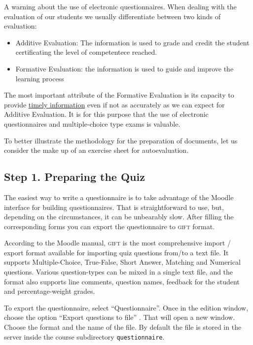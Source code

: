 \documentclass{pracjourn}[2006/02/20]
\begin{document}
A warning about the use of electronic questionnaires.
Wh\-e\-n dealing with the evaluation of our students 
we usually differentiate between two kinds of evaluation:
\begin{itemize}
\item Additive Evaluation: The information is used to grade and credit the
student certificating the level of competentece reached.
\item Formative Evaluation: the information is used to guide and improve the
learning process
\end{itemize}
The most important attribute of the Formative Evaluation
is its capacity to provide \underline{timely information} even if not as accurately
as we can expect for Additive Evaluation.
It is for this purpose that the use of electronic questionnaires
and multiple-choice type exams is valuable. 

To better illustrate the methodology for the preparation of documents,
let us consider the make up of an exercise sheet for 
autoevaluation. 

\subsection*{Step 1. Preparing the Quiz}

The easiest way to write a questionnaire is 
to take advantage of the 
Moodle interface for building questionnaires. 
That is straightforward to use, but,
depending on the circumstances, it can be unbearably 
slow. After filling the corresponding forms
you can export the questionnaire to \textsc{gift} format.

According to the Moodle manual, \textsc{gift} is the most comprehensive import / export
format available for importing quiz questions from/to a text file. 
It supports Multiple-Choice, True-False, Short Answer, Matching
and Numerical questions.  Various question-types can be mixed in a single text file,
and the format also supports line comments, question names, feedback for the student
and percentage-weight grades.

To export the questionnaire, select ``Questionnaire''.
Once in the edition window, choose the option ``Export questions to file''
. 
That will open a new window. 
Choose  the format and the name of the file.
By default the file is stored in the server inside the course subdirectory 
\verb|questionnaire|.
\end{document}

